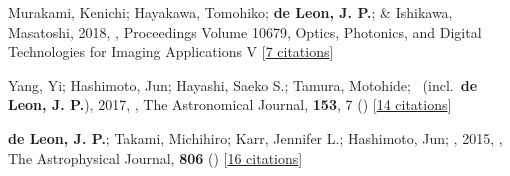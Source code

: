\item[{\color{numcolor}\scriptsize3}] Murakami, Kenichi; Hayakawa, Tomohiko; \textbf{de Leon, J. P.}; \& Ishikawa, Masatoshi, 2018, , Proceedings Volume 10679, Optics, Photonics, and Digital Technologies for Imaging Applications V [\href{https://www.spiedigitallibrary.org/conference-proceedings-of-spie/10679/2306621/Real-time-high-speed-motion-blur-compensation-method-using-galvanometer/10.1117/12.2306621.short}{7 citations}]

\item[{\color{numcolor}\scriptsize2}] Yang, Yi; Hashimoto, Jun; Hayashi, Saeko S.; Tamura, Motohide; \etal\ (incl.\ \textbf{de Leon, J. P.}), 2017, , The Astronomical Journal, \textbf{153}, 7 () [\href{https://ui.adsabs.harvard.edu/abs/2017AJ....153....7Y}{14 citations}]

\item[{\color{numcolor}\scriptsize1}] \textbf{de Leon, J. P.}; Takami, Michihiro; Karr, Jennifer L.; Hashimoto, Jun; \etal, 2015, , The Astrophysical Journal, \textbf{806} () [\href{https://ui.adsabs.harvard.edu/abs/2015ApJ...806L..10D}{16 citations}]